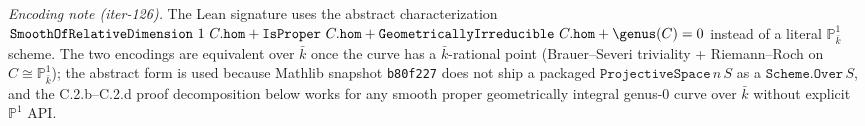 \begin{theorem}
  \emph{Encoding note (iter-126).} The Lean signature uses the abstract characterization \(\mathtt{SmoothOfRelativeDimension}\ 1\ C.\mathtt{hom} + \mathtt{IsProper}\ C.\mathtt{hom} + \mathtt{GeometricallyIrreducible}\ C.\mathtt{hom} + \genus(C) = 0\) instead of a literal \(\mathbb P^1_{\bar k}\) scheme. The two encodings are equivalent over \(\bar k\) once the curve has a \(\bar k\)-rational point (Brauer--Severi triviality + Riemann--Roch on \(C \cong \mathbb P^1_{\bar k}\)); the abstract form is used because Mathlib snapshot \texttt{b80f227} does not ship a packaged \(\mathtt{ProjectiveSpace}\,n\,S\) as a \(\mathtt{Scheme.Over}\,S\), and the C.2.b–C.2.d proof decomposition below works for any smooth proper geometrically integral genus-0 curve over \(\bar k\) without explicit \(\mathbb P^1\) API.
\end{theorem}

